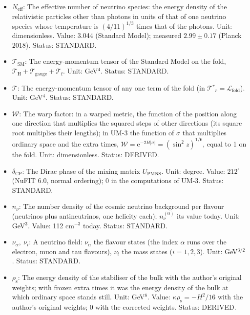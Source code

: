 \documentclass[
  10pt,
]{article}
\begin{document}
\begin{itemize}
  STANDARD.
\item
  \(N_{\mathrm{eff}}\): The effective number of neutrino species: the
  energy density of the relativistic particles other than photons in
  units of that of one neutrino species whose temperature is
  \((4/11)^{1/3}\) times that of the photons. Unit: dimensionless.
  Value: 3.044 (Standard Model); measured \(2.99 \pm 0.17\) (Planck
  2018). Status: STANDARD.
\item
  \(\mathcal{T}_{\mathrm{SM}}\): The energy-momentum tensor of the
  Standard Model on the fold,
  \(\mathcal{T}_{\mathrm{H}} + \mathcal{T}_{\mathrm{gauge}} + \mathcal{T}_{\mathrm{f}}\).
  Unit: GeV\(^4\). Status: STANDARD.
\item
  \(\mathcal{T}\): The energy-momentum tensor of any one term of the
  fold (in \(\mathcal{T}^r{}_r = \mathcal{L}_{\mathrm{fold}}\)). Unit:
  GeV\(^4\). Status: STANDARD.
\item
  \(\mathcal{W}\): The warp factor: in a warped metric, the function of
  the position along one direction that multiplies the squared steps of
  other directions (its square root multiplies their lengths); in UM-3
  the function of \(\sigma\) that multiplies ordinary space and the
  extra times,
  \(\mathcal{W} = \mathrm{e}^{-2H\lvert\sigma\rvert} = (\sin^2z)^{1/6}\),
  equal to 1 on the fold. Unit: dimensionless. Status: DERIVED.
\item
  \(\delta_{\mathrm{CP}}\): The Dirac phase of the mixing matrix
  \(U_{\mathrm{PMNS}}\). Unit: degree. Value: \(212^\circ\) (NuFIT 6.0,
  normal ordering); 0 in the computations of UM-3. Status: STANDARD.
\item
  \(n_\nu\): The number density of the cosmic neutrino background per
  flavour (neutrinos plus antineutrinos, one helicity each);
  \(n_\nu^{(0)}\) its value today. Unit: GeV\(^3\). Value: 112
  cm\(^{-3}\) today. Status: STANDARD.
\item
  \(\nu_\alpha,\ \nu_i\): A neutrino field: \(\nu_\alpha\) the flavour
  states (the index \(\alpha\) runs over the electron, muon and tau
  flavours), \(\nu_i\) the mass states (\(i = 1, 2, 3\)). Unit:
  GeV\(^{3/2}\). Status: STANDARD.
\item
  \(\rho_{\mathrm{s}}\): The energy density of the stabiliser of the
  bulk with the author's original weights; with frozen extra times it
  was the energy density of the bulk at which ordinary space stands
  still. Unit: GeV\(^8\). Value: \(\kappa\rho_{\mathrm{s}} = -H^2/16\)
  with the author's original weights; 0 with the corrected weights.
  Status: DERIVED.

\end{itemize}
\end{document}
